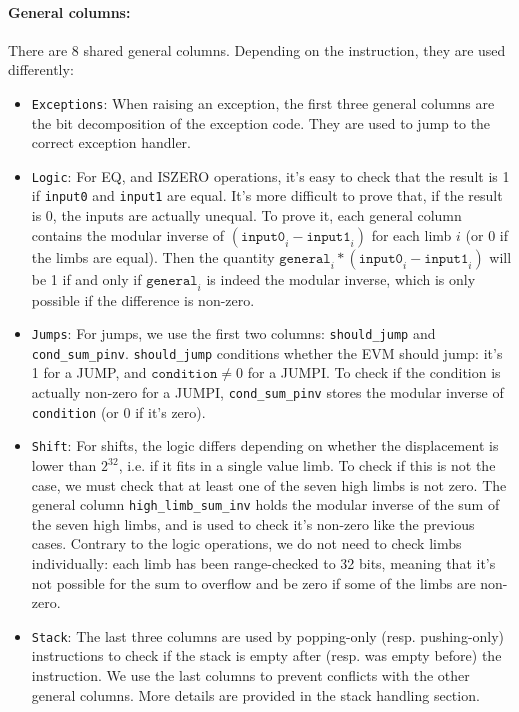 \paragraph*{General columns:} There are 8 shared general columns. Depending on the instruction, they are used differently:
\begin{itemize}
    \item  \texttt{Exceptions}: When raising an exception, the first three general columns are the bit decomposition of the exception code.
They are used to jump to the correct exception handler.
    \item  \texttt{Logic}: For EQ, and ISZERO operations, it's easy to check that the result is 1 if \texttt{input0} and \texttt{input1} are equal. It's more difficult
to prove that, if the result is 0, the inputs are actually unequal. To prove it, each general column contains the modular inverse of $(\texttt{input0}_i - \texttt{input1}_i)$
for each limb $i$ (or 0 if the limbs are equal). Then the quantity $\texttt{general}_i * (\texttt{input0}_i - \texttt{input1}_i)$ will be 1 if and only if $\texttt{general}_i$ is
indeed the modular inverse, which is only possible if the difference is non-zero.
    \item  \texttt{Jumps}: For jumps, we use the first two columns: \texttt{should\_jump} and \texttt{cond\_sum\_pinv}. \texttt{should\_jump} conditions whether the EVM should jump: it's
1 for a JUMP, and $\texttt{condition} \neq 0$ for a JUMPI. To check if the condition is actually non-zero for a JUMPI, \texttt{cond\_sum\_pinv} stores the modular inverse of
\texttt{condition} (or 0 if it's zero).
    \item  \texttt{Shift}: For shifts, the logic differs depending on whether the displacement is lower than $2^{32}$, i.e. if it fits in a single value limb.
To check if this is not the case, we must check that at least one of the seven high limbs is not zero. The general column \texttt{high\_limb\_sum\_inv} holds the modular inverse
of the sum of the seven high limbs, and is used to check it's non-zero like the previous cases.
Contrary to the logic operations, we do not need to check limbs individually: each limb has been range-checked to 32 bits, meaning that it's not possible for the sum to
overflow and be zero if some of the limbs are non-zero.
    \item  \texttt{Stack}: The last three columns are used by popping-only (resp. pushing-only) instructions to check if the stack is empty after (resp. was empty
before) the instruction. We use the last columns to prevent conflicts with the other general columns. More details are provided in the stack handling section.
\end{itemize}
